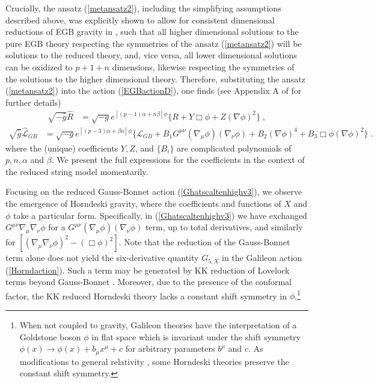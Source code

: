 \documentclass[amsmath,amssymb,11pt]{article}
\newcommand{\beq}{\begin{equation}}
\newcommand{\eeq}{\end{equation}}
\begin{document}
Crucially, the ansatz (\ref{metansatz2}), including the simplifying assumptions described above, was explicitly shown to allow for consistent dimensional reductions of EGB gravity in \cite{Gouteraux:2011qh}, such that  all higher dimensional solutions to the pure EGB theory respecting the symmetries of the ansatz (\ref{metansatz2}) will be solutions to the reduced theory, and, vice versa, all lower dimensional solutions can be oxidized to $p+1+n$ dimensions, likewise respecting the symmetries of the solutions to the higher dimensional theory. Therefore, substituting the ansatz (\ref{metansatz2}) into the action (\ref{EGBactionD}), one finds \cite{Gouteraux:2011qh,Charmousis12-1} (see Appendix A of \cite{Easson:2020bgk} for further details)
\beq
\begin{split}
\sqrt{-\hat{g}}\hat{R}&=\sqrt{-g}e^{[(p-1)\alpha+n\beta]\phi}\biggr\{R+Y\Box\phi+Z(\nabla\phi)^{2}\biggr\}\;,
\end{split}
\label{EHterm1}\eeq
\beq \begin{split}
\sqrt{\hat{g}}\hat{\mathcal{L}}_{GB}&=\sqrt{-g}e^{[(p-3)\alpha+\beta n]\phi}\biggr\{\mathcal{L}_{GB}+B_{1}G^{\mu\nu}(\nabla_{\mu}\phi)(\nabla_{\nu}\phi)+B_{2}(\nabla\phi)^{4}+B_{3}\Box\phi(\nabla\phi)^{2}\biggr\}\;.
\end{split}
\label{Ghatscaltenhighv3}\eeq
where the (unique) coefficients $Y,Z$, and $\{B_{i}\}$ are complicated polynomials of $p,n,\alpha$ and $\beta$. We present the full expressions for the coefficients in the context of the reduced string model momentarily.

Focusing on the reduced Gauss-Bonnet action (\ref{Ghatscaltenhighv3}), we observe the emergence of Horndeski gravity, where the coefficients and functions of $X$ and $\phi$ take a particular form. Specifically, in (\ref{Ghatscaltenhighv3}) we have exchanged $G^{\mu\nu}\nabla_{\mu}\nabla_{\nu}\phi$ for a $G^{\mu\nu}(\nabla_{\mu}\phi)(\nabla_{\nu}\phi)$ term, up to total derivatives, and similarly for $[(\nabla_{\mu}\nabla_{\nu}\phi)^{2}-(\Box\phi)^{2}]$. Note that the reduction of the Gauss-Bonnet term alone does not yield the six-derivative quantity $G_{5,X}$ in the Galileon action (\ref{Horndaction}). Such a term may be generated by KK reduction of Lovelock terms beyond Gauss-Bonnet \cite{VanAcoleyen11-1,Charmousis:2011bf}. Moreover, due to the presence of the conformal factor, the KK reduced Horndeski theory lacks a constant shift symmetry in $\phi$.\footnote{When not coupled to gravity, Galileon theories have the interpretation of a Goldstone boson $\phi$ in flat space which is invariant under the shift symmetry $\phi(x)\to\phi(x)+b_{\mu}x^{\mu}+c$ for arbitrary parameters $b^{\mu}$ and $c$. As modifications to general relativity \cite{Nicolis:2008in}, some Horndeski theories preserve the constant shift symmetry.}
\end{document}

